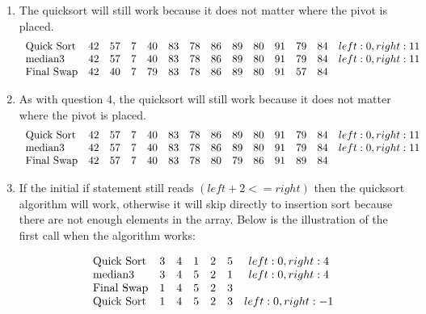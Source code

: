 \documentclass[10pt]{article}
\begin{document}
\begin{enumerate}
\item The quicksort will still work because it does not matter where the pivot is placed.
\[
\begin{array}{lccccccccccccc}
$Quick Sort$ & 42 & 57 & 7 & 40 & 83 & 78 & 86 & 89 & 80 & 91 & 79 & 84 & left: 0, right: 11\\
$median3$ & 42 & 57 & 7 & 40 & 83 & 78 & 86 & 89 & 80 & 91 & 79 & 84 & left: 0, right: 11\\
$Final Swap$& 42 & 40 & 7 & 79 & 83 & 78 & 86 & 89 & 80 & 91 & 57 & 84 \\
\end{array}
\]
  \item As with question 4, the quicksort will still work because it does not matter where the pivot is placed.
\[
\begin{array}{lccccccccccccc}
$Quick Sort$ & 42 & 57 & 7 & 40 & 83 & 78 & 86 & 89 & 80 & 91 & 79 & 84 & left: 0, right: 11\\
$median3$ & 42 & 57 & 7 & 40 & 83 & 78 & 86 & 89 & 80 & 91 & 79 & 84 & left: 0, right: 11\\
$Final Swap$& 42 & 57 & 7 & 40 & 83 & 78 & 80 & 79 & 86 & 91 & 89 & 84 \\
\end{array}
\]

\item If the initial if statement still reads $(left + 2 <= right)$ then the quicksort algorithm will work, otherwise it will skip 
      directly to insertion sort because there are not enough elements in the array. Below is the illustration of the first call
      when the algorithm works:

\[
\begin{array}{lcccccc}
$Quick Sort$ & 3 & 4 & 1 & 2 & 5 & left: 0, right: 4\\
$median3$ & 3 & 4 & 5 & 2 & 1 & left: 0, right: 4\\
$Final Swap$& 1 & 4 & 5 & 2 & 3 \\
$Quick Sort$ & 1 & 4 & 5 & 2 & 3 & left: 0, right: -1
\end{array}
\]
\end{enumerate}
\end{document}
